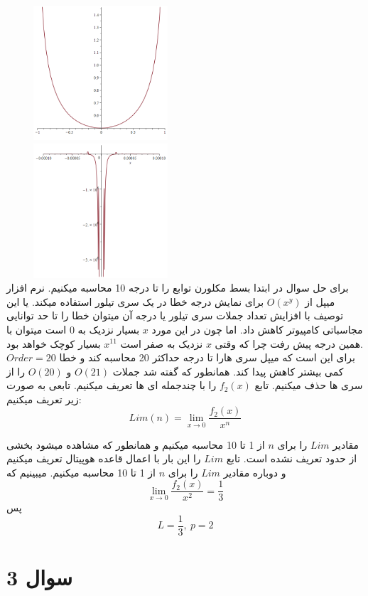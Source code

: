 \documentclass[12pt, letterpaper]{article}
\begin{document}
\includegraphics[height=5cm, width=7cm]{figure1.png}
\includegraphics[height=5cm, width=7cm]{figure2.png}
\\


برای حل سوال در ابتدا بسط مکلورن توابع را تا درجه 10 محاسبه میکنیم. نرم افزار میپل از
\(O(x^y)\)
 برای نمایش درجه خطا در یک سری تیلور استفاده میکند. یا این توصیف با افزایش تعداد جملات سری تیلور یا درجه آن میتوان خطا را تا حد توانایی مجاسباتی کامپیوتر کاهش داد. اما چون در این مورد 
\(x\)
 بسیار نزدیک به 0 است میتوان با همین درجه پیش رفت چرا که وقتی 
\(x\) 
 نزدیک به صفر است 
\(x^{11}\)
 بسیار کوچک خواهد بود.
\\
\(Order=20\)
برای این است که میپل سری هارا تا درجه حداکثر 20 محاسبه کند و خطا کمی بیشتر کاهش پیدا کند. همانطور که گفته شد جملات
\(O(21)\)
و 
\(O(20)\)
را از سری ها حذف میکنیم. تابع 
\(f_2(x)\)
 را با چندجمله ای ها تعریف میکنیم. تابعی به صورت زیر تعریف میکنیم:
\[Lim(n) = \lim_{x\to 0}\frac {f_2(x)}{x^n}\]

\vspace{5 mm}
مقادیر 
\(Lim\)
 را برای 
\(n\)
 از 1 تا 10 محاسبه میکنیم و همانطور که مشاهده میشود بخشی از حدود تعریف نشده است.
تابع \(Lim\) را این بار با اعمال قاعده هوپیتال تعریف میکنیم و دوباره مقادیر \(Lim\) را برای \(n\) از 1 تا 10 محاسبه میکنیم. میبینیم که
\[ \lim_{x\to 0}\frac {f_2(x)}{x^2} = \frac{1}{3}\]
پس 
\[ L = \frac{1}{3}, \: p = 2\]


\section{سوال 3}
\end{document}
